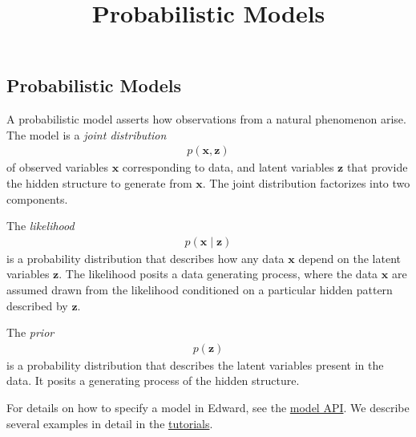 \title{Probabilistic Models}

\subsection{Probabilistic Models}

A probabilistic model asserts how observations from a natural phenomenon arise.
The model is a \emph{joint distribution}
\begin{align*}
  p(\mathbf{x}, \mathbf{z})
\end{align*}
of observed variables $\mathbf{x}$ corresponding to data, and latent
variables $\mathbf{z}$ that provide the hidden structure to generate
from $\mathbf{x}$. The joint distribution factorizes into two
components.

The \emph{likelihood}
\begin{align*}
  p(\mathbf{x} \mid \mathbf{z})
\end{align*}
is a probability distribution that describes how any data $\mathbf{x}$
depend on the latent variables $\mathbf{z}$. The likelihood posits a
data generating process, where the data $\mathbf{x}$ are assumed drawn
from the likelihood conditioned on a particular hidden pattern
described by $\mathbf{z}$.

The \emph{prior}
\begin{align*}
  p(\mathbf{z})
\end{align*}
is a probability distribution that describes the latent variables
present in the data. It posits a generating process of the hidden structure.

For details on how to specify a model in Edward, see the
\href{/api/model}{model API}. We describe several examples in detail
in the \href{/tutorials/}{tutorials}.
